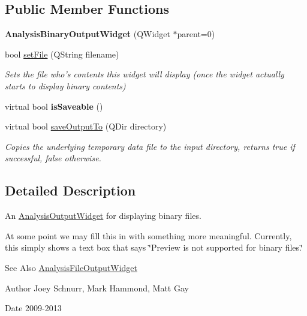 \subsection*{Public Member Functions}
\begin{DoxyCompactItemize}
\item 
\hypertarget{class_picto_1_1_analysis_binary_output_widget_ae9294e0880e9c6c03418b37d127adb45}{{\bfseries Analysis\-Binary\-Output\-Widget} (Q\-Widget $\ast$parent=0)}\label{class_picto_1_1_analysis_binary_output_widget_ae9294e0880e9c6c03418b37d127adb45}

\item 
bool \hyperlink{class_picto_1_1_analysis_binary_output_widget_aa51004cdf746bf6f6427ba87eeb77c39}{set\-File} (Q\-String filename)
\begin{DoxyCompactList}\small\item\em Sets the file who's contents this widget will display (once the widget actually starts to display binary contents) \end{DoxyCompactList}\item 
\hypertarget{class_picto_1_1_analysis_binary_output_widget_a3671594534285878ae930448706d56d6}{virtual bool {\bfseries is\-Saveable} ()}\label{class_picto_1_1_analysis_binary_output_widget_a3671594534285878ae930448706d56d6}

\item 
virtual bool \hyperlink{class_picto_1_1_analysis_binary_output_widget_ae2c682093f0a615be65e9aadd99ecf24}{save\-Output\-To} (Q\-Dir directory)
\begin{DoxyCompactList}\small\item\em Copies the underlying temporary data file to the input directory, returns true if successful, false otherwise. \end{DoxyCompactList}\end{DoxyCompactItemize}


\subsection{Detailed Description}
An \hyperlink{class_picto_1_1_analysis_output_widget}{Analysis\-Output\-Widget} for displaying binary files. 

At some point we may fill this in with something more meaningful. Currently, this simply shows a text box that says \char`\"{}\-Preview is not supported for binary files.\char`\"{} \begin{DoxySeeAlso}{See Also}
\hyperlink{class_picto_1_1_analysis_file_output_widget}{Analysis\-File\-Output\-Widget} 
\end{DoxySeeAlso}
\begin{DoxyAuthor}{Author}
Joey Schnurr, Mark Hammond, Matt Gay 
\end{DoxyAuthor}
\begin{DoxyDate}{Date}
2009-\/2013 
\end{DoxyDate}



